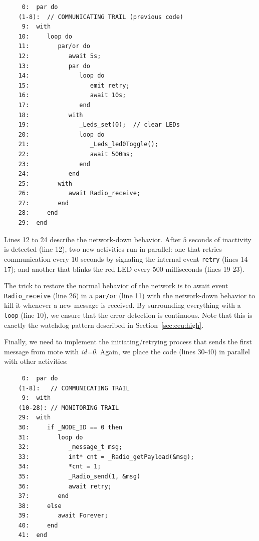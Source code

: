 \documentclass{sig-alternate}
\newcommand{\2}{\;\;}
\newcommand{\5}{\;\;\;\;\;}
\newcommand{\code}[1] {{\small{\texttt{#1}}}}
\begin{document}
{\small
\begin{verbatim}
     0:  par do
    (1-8):  // COMMUNICATING TRAIL (previous code)
     9:  with
    10:     loop do
    11:        par/or do
    12:           await 5s;
    13:           par do
    14:              loop do
    15:                 emit retry;
    16:                 await 10s;
    17:              end
    18:           with
    19:              _Leds_set(0);  // clear LEDs
    20:              loop do
    21:                 _Leds_led0Toggle();
    22:                 await 500ms;
    23:              end
    24:           end
    25:        with
    26:           await Radio_receive;
    27:        end
    28:     end
    29:  end
\end{verbatim}
}

Lines 12 to 24 describe the network-down behavior.
After $5$ seconds of inactivity is detected (line 12), two new activities run 
in parallel: one that retries communication every $10$ seconds by signaling the 
internal event \code{retry} (lines 14-17); and another that blinks the red LED 
every $500$ milliseconds (lines 19-23).

The trick to restore the normal behavior of the network is to await event 
\code{Radio\_receive} (line 26) in a \code{par/or} (line 11) with the 
network-down behavior to kill it whenever a new message is received.
By surrounding everything with a \code{loop} (line 10), we ensure that the 
error detection is continuous.
Note that this is exactly the watchdog pattern described in 
Section~\ref{sec:ceu:high}.


Finally, we need to implement the initiating/retrying process that sends the 
first message from mote with \emph{id=0}.
Again, we place the code (lines 30-40) in parallel with other activities:

{\small
\begin{verbatim}
     0:  par do
    (1-8):   // COMMUNICATING TRAIL
     9:  with
    (10-28): // MONITORING TRAIL
    29:  with
    30:     if _NODE_ID == 0 then
    31:        loop do
    32:           _message_t msg;
    33:           int* cnt = _Radio_getPayload(&msg);
    34:           *cnt = 1;
    35:           _Radio_send(1, &msg)
    36:           await retry;
    37:        end
    38:     else
    39:        await Forever;
    40:     end
    41:  end
\end{verbatim}
}
\end{document}
